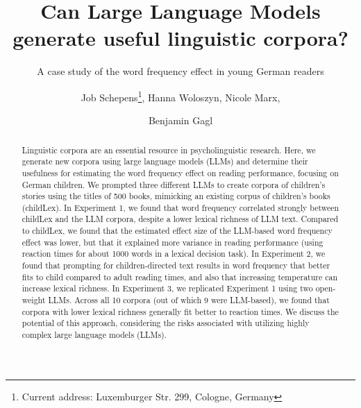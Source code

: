 \documentclass[manuscript]{stjour}
\begin{document}
\title[LLMs for generating linguistic corpora]{Can Large Language Models generate useful linguistic corpora? }
\subtitle{A case study of the word frequency effect in young German readers}



\author[Job Schepens, Hanna Woloszyn, Nicole Marx, Benjamin Gagl]
{Job Schepens\thanks{Current address: Luxemburger Str. 299, Cologne, Germany},
Hanna Woloszyn, Nicole Marx, \\
\and Benjamin Gagl}




\begin{abstract}
Linguistic corpora are an essential resource in psycholinguistic research. Here, we generate new corpora using large language models (LLMs) and determine their usefulness for estimating the word frequency effect on reading performance, focusing on German children. We prompted three different LLMs to create corpora of children's stories using the titles of 500 books, mimicking an existing corpus of children's books (childLex). In Experiment 1, we found that word frequency correlated strongly between childLex and the LLM corpora, despite a lower lexical richness of LLM text. Compared to childLex, we found that the estimated effect size of the LLM-based word frequency effect was lower, but that it explained more variance in reading performance (using reaction times for about 1000 words in a lexical decision task). In Experiment 2, we found that prompting for children-directed text results in word frequency that better fits to child compared to adult reading times, and also that increasing temperature can increase lexical richness. In Experiment 3, we replicated Experiment 1 using two open-weight LLMs. Across all 10 corpora (out of which 9 were LLM-based), we found that corpora with lower lexical richness generally fit better to reaction times. We discuss the potential of this approach, considering the risks associated with utilizing highly complex large language models (LLMs).
\end{abstract}
\end{document}
